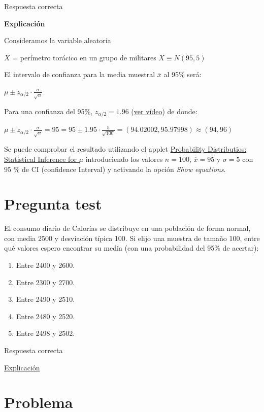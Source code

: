 \documentclass[
]{book}
\providecommand{\tightlist}{%
  \setlength{\itemsep}{0pt}\setlength{\parskip}{0pt}}
\begin{document}
Respuesta correcta

\textbf{Explicación}

Consideramos la variable aleatoria

\(X\) = perímetro torácico en un grupo de militares \(X \equiv N(95, 5)\)

El intervalo de confianza para la media muestral \(\overline{x}\) al 95\% será:

\(\mu \pm z_{\alpha/2} \cdot \frac{\sigma}{\sqrt{n}}\)

Para una confianza del 95\%, \(z_{\alpha/2} = 1.96\) (\href{https://youtu.be/wWeogWp_bO8}{ver vídeo}) de donde:

\(\mu \pm z_{\alpha/2} \cdot \frac{\sigma}{\sqrt{n}}= 95 = 95 \pm 1.95 \cdot \frac{5}{\sqrt{100}}= (94.02002,95.97998) \approx (94, 96)\)

Se puede comprobar el resultado utilizando el applet \href{https://homepage.divms.uiowa.edu/~mbognar/applets/mu.raw.html}{Probability Distributios: Statistical Inference for \(\mu\)} introduciendo los valores \(n=100\), \(\overline{x}=95\) y \(\sigma = 5\) con \(95\) \% de CI (confidence Interval) y activando la opción \emph{Show equations}.

\hypertarget{pregunta-test-101}{%
\section{Pregunta test}\label{pregunta-test-101}}

El consumo diario de Calorías se distribuye en una población de forma normal, con media 2500 y desviación típica 100. Si elijo una muestra de tamaño 100, entre qué valores espero encontrar su media (con una probabilidad del 95\% de acertar):

\begin{enumerate}
\def\labelenumi{\alph{enumi})}
\tightlist
\item
  Entre 2400 y 2600.
\item
  Entre 2300 y 2700.
\item
  Entre 2490 y 2510.
\item
  Entre 2480 y 2520.
\item
  Entre 2498 y 2502.
\end{enumerate}

Respuesta correcta

\href{https://homepage.divms.uiowa.edu/~mbognar/}{Explicación}

\hypertarget{problema-12}{%
\section{Problema}\label{problema-12}}
\end{document}
